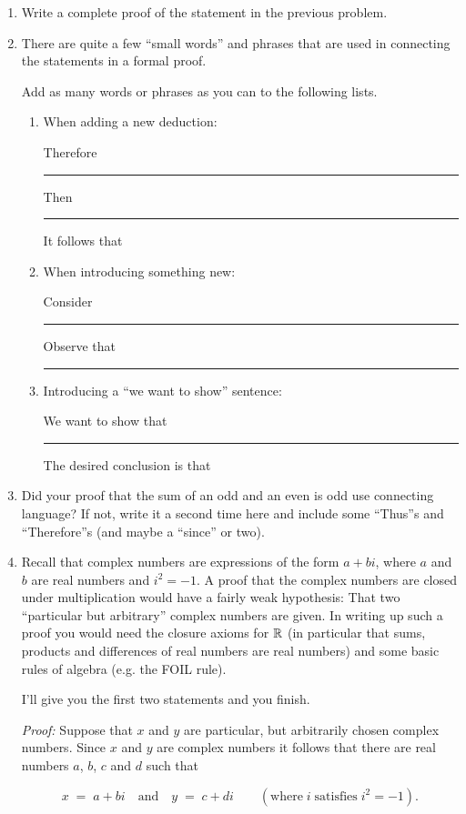 \documentclass{amsart}
\begin{document}
\begin{enumerate}
\item Write a complete proof of the statement in the previous problem.

\vfill

\vfill

\newpage

\item There are quite a few ``small words'' and phrases that are used in connecting the statements in a formal proof.

Add as many words or phrases as you can to the following lists.

\begin{enumerate}
\item \rule{0pt}{30pt} When adding a new deduction:

Therefore \rule{36pt}{0pt} Then \rule{36pt}{0pt} It follows that 


\item \rule{0pt}{30pt} When introducing something new:

Consider \rule{36pt}{0pt} Observe that \rule{36pt}{0pt} 

\item \rule{0pt}{30pt} Introducing a ``we want to show'' sentence:

We want to show that \rule{36pt}{0pt} The desired conclusion is that 

\end{enumerate}

\vspace{.5in}

\item Did your proof that the sum of an odd and an even is odd use connecting language?  If not, write it a second time here and include some ``Thus''s and ``Therefore''s (and maybe a ``since'' or two).

\vfill

\newpage

\item Recall that complex numbers are expressions of the form $a + bi$, where $a$ and $b$ are real numbers and $i^2 = -1$.  A proof that the complex numbers are closed under multiplication would have a fairly weak hypothesis:  That two ``particular but arbitrary'' complex numbers are given. In writing up such a proof you would need the closure axioms for ${\mathbb R}$ (in particular that sums, products and differences of real numbers are real numbers) and some basic rules of algebra (e.g. the FOIL rule).

I'll give you the first two statements and you finish.

\vspace{.5in}

{\em Proof:} Suppose that $x$ and $y$ are particular, but arbitrarily chosen complex numbers.  Since $x$ and $y$ are complex numbers it follows that there are real numbers $a$, $b$, $c$ and $d$ such that

\[ x \; = \; a+bi \quad \mbox{and} \quad y \; = \; c+di \qquad ( \mbox{where} \; i \; \mbox{satisfies} \; i^2 = -1). \]



\vfill

\end{enumerate}
\end{document}
